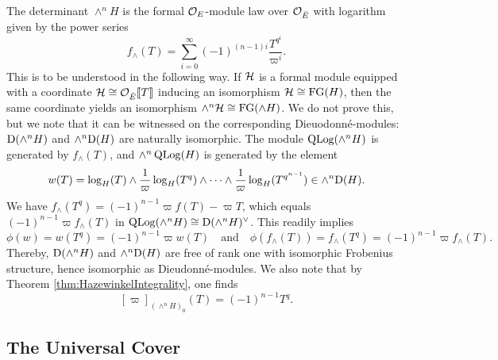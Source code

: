 \documentclass[../main.tex]{subfiles}
\begin{document}
\begin{xpl}
  The determinant $\wedge^n H$ is the formal $\mathcal{O}_E$-module law over 
  $\mathcal{O}_{\breve {E}}$ with logarithm given by the power series
  \begin{equation*}
    f_\wedge(T) = \sum_{i=0}^\infty (-1)^{(n-1)i} \frac{T^{q^i}}{\varpi^i}.
  \end{equation*}
  This is to be understood in the following way. If $\mathcal{H}$ is a formal module
  equipped with a coordinate $\mathcal{H} \cong \mathcal{O}_{\breve {E}} \llbracket T \rrbracket$ inducing an 
  isomorphism $\mathcal{H} \cong \textnormal{FG}(H)$, then the same coordinate yields 
  an isomorphism $\wedge^n \mathcal{H} \cong \textnormal{FG}(\wedge H)$. We do not prove this,
  but we note that it can be witnessed on the
  corresponding Dieuodonn\'e-modules: $\mathrm{D}(\wedge^n H)$ and 
  $\wedge^n \mathrm{D}(H)$ are naturally isomorphic. The module $\operatorname {QLog}(\wedge^n H)$
  is
  generated by $f_\wedge(T)$, and $\wedge^n \operatorname {QLog}(H)$ is generated by the element
  \begin{equation*}
    w(T) = \log_H(T) \wedge \frac 1\varpi \log_H(T^q) \wedge \dots \wedge \frac 1\varpi \log_H(T^{q^{n-1}}) \in \wedge^n \mathrm{D}(H).
  \end{equation*}
  We have $f_\wedge(T^q) = (-1)^{n-1} \varpi f(T) - \varpi T$, which equals
  $(-1)^{n-1}\varpi f_\wedge(T)$ in $\operatorname {QLog}(\wedge^n H) \cong \mathrm{D}(\wedge^n
  H)^\vee$. 
  This readily implies
  \begin{equation*}
    \phi(w) = w(T^q) = (-1)^{n-1} \varpi w(T) \quad \text{and} \quad
    \phi(f_\wedge(T)) = f_\wedge(T^q) = (-1)^{n-1}\varpi f_\wedge(T).
  \end{equation*}
  Thereby, $\mathrm{D}(\wedge^n H)$ and $\wedge^n \mathrm{D}(H)$ are free of rank one
  with isomorphic Frobenius structure, hence isomorphic as Dieudonn\'e-modules.
  We also note that by Theorem \ref{thm:HazewinkelIntegrality}, one finds
  \begin{equation} \label{eq:detformalmodulevarpiexpl}
    [\varpi]_{(\wedge^n H)_0}(T) = (-1)^{n-1} T^q.
  \end{equation}
\end{xpl}


\subsection{The Universal Cover} %
\label{sub:Tate Modules and the Universal Cover} 
\end{document}
